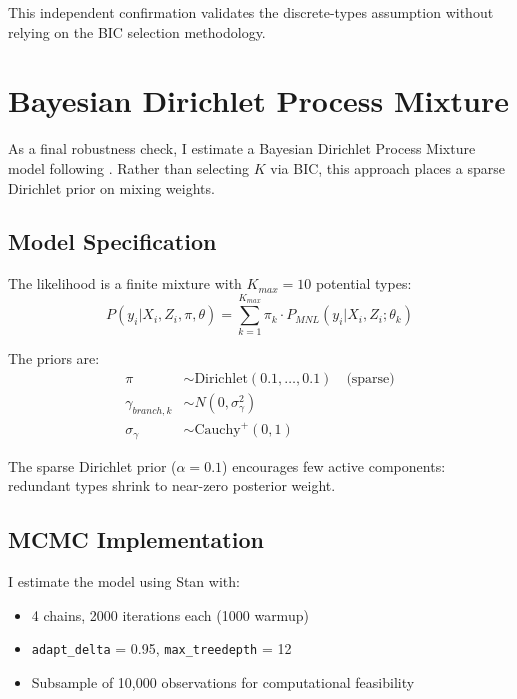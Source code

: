 \documentclass[12pt]{article}
\begin{document}
This independent confirmation validates the discrete-types assumption without relying on the BIC selection methodology.

\section{Bayesian Dirichlet Process Mixture}
\label{app:bayesian}

As a final robustness check, I estimate a Bayesian Dirichlet Process Mixture model following \citet{malsiner2016}. Rather than selecting $K$ via BIC, this approach places a sparse Dirichlet prior on mixing weights.

\subsection{Model Specification}

The likelihood is a finite mixture with $K_{max} = 10$ potential types:
\begin{equation}
P(y_i | X_i, Z_i, \pi, \theta) = \sum_{k=1}^{K_{max}} \pi_k \cdot P_{MNL}(y_i | X_i, Z_i; \theta_k)
\end{equation}

The priors are:
\begin{align}
\pi &\sim \text{Dirichlet}(0.1, \ldots, 0.1) \quad \text{(sparse)} \\
\gamma_{branch,k} &\sim N(0, \sigma_\gamma^2) \\
\sigma_\gamma &\sim \text{Cauchy}^+(0, 1)
\end{align}

The sparse Dirichlet prior ($\alpha = 0.1$) encourages few active components: redundant types shrink to near-zero posterior weight.

\subsection{MCMC Implementation}

I estimate the model using Stan with:
\begin{itemize}
    \item 4 chains, 2000 iterations each (1000 warmup)
    \item \texttt{adapt\_delta} = 0.95, \texttt{max\_treedepth} = 12
    \item Subsample of 10,000 observations for computational feasibility
\end{itemize}
\end{document}
